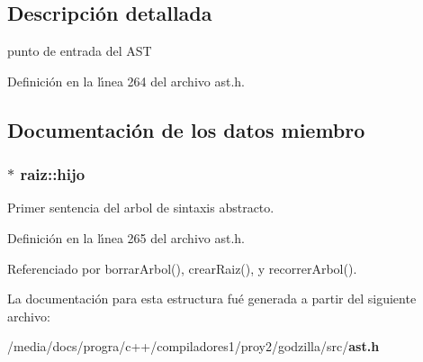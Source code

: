 \subsection{Descripci\'{o}n detallada}
punto de entrada del AST 



Definici\'{o}n en la l\'{\i}nea 264 del archivo ast.h.

\subsection{Documentaci\'{o}n de los datos miembro}
\subsubsection{$\ast$ {\bf raiz::hijo}}\label{structraiz_o0}


Primer sentencia del arbol de sintaxis abstracto. 



Definici\'{o}n en la l\'{\i}nea 265 del archivo ast.h.

Referenciado por borrar\-Arbol(), crear\-Raiz(), y recorrer\-Arbol().

La documentaci\'{o}n para esta estructura fu\'{e} generada a partir del siguiente archivo:\begin{CompactItemize}
\item 
/media/docs/progra/c++/compiladores1/proy2/godzilla/src/{\bf ast.h}\end{CompactItemize}
